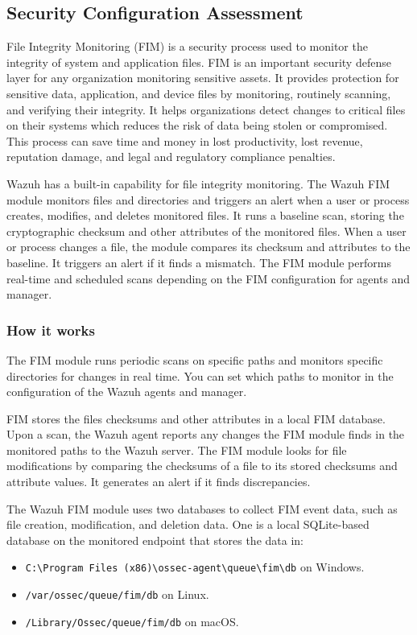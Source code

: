 \subsection{Security Configuration Assessment}
File Integrity Monitoring (FIM) is a security process used to monitor the integrity of system and application files. FIM is an important security defense layer for any organization monitoring sensitive assets. It provides protection for sensitive data, application, and device files by monitoring, routinely scanning, and verifying their integrity. It helps organizations detect changes to critical files on their systems which reduces the risk of data being stolen or compromised. This process can save time and money in lost productivity, lost revenue, reputation damage, and legal and regulatory compliance penalties.

Wazuh has a built-in capability for file integrity monitoring. The Wazuh FIM module monitors files and directories and triggers an alert when a user or process creates, modifies, and deletes monitored files. It runs a baseline scan, storing the cryptographic checksum and other attributes of the monitored files. When a user or process changes a file, the module compares its checksum and attributes to the baseline. It triggers an alert if it finds a mismatch. The FIM module performs real-time and scheduled scans depending on the FIM configuration for agents and manager.

\subsubsection{How it works}
The FIM module runs periodic scans on specific paths and monitors specific directories for changes in real time. You can set which paths to monitor in the configuration of the Wazuh agents and manager.

FIM stores the files checksums and other attributes in a local FIM database. Upon a scan, the Wazuh agent reports any changes the FIM module finds in the monitored paths to the Wazuh server. The FIM module looks for file modifications by comparing the checksums of a file to its stored checksums and attribute values. It generates an alert if it finds discrepancies.

The Wazuh FIM module uses two databases to collect FIM event data, such as file creation, modification, and deletion data. One is a local SQLite-based database on the monitored endpoint that stores the data in:
\begin{itemize}
    \item \texttt{C:\textbackslash Program Files (x86)\textbackslash ossec-agent\textbackslash queue\textbackslash fim\textbackslash db} on Windows.
    \item \texttt{/var/ossec/queue/fim/db} on Linux.
    \item \texttt{/Library/Ossec/queue/fim/db} on macOS.
\end{itemize}

